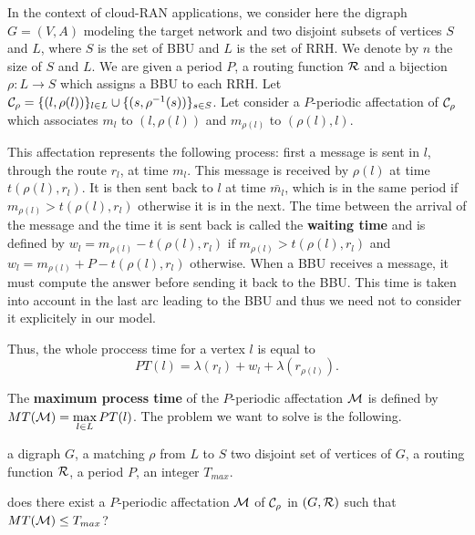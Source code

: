 \documentclass[a4paper,10pt]{article}
\begin{document}
      
      In the context of cloud-RAN applications, we consider here the digraph $G=(V,A)$ modeling the target network 
      and two disjoint subsets of vertices $S$ and $L$, where $S$ is the set of BBU and $L$ is the set of RRH. 
      We denote by $n$ the size of $S$ and $L$. We are given a period $P$, a routing function ${\cal R}$ and a bijection $\rho:L\rightarrow S$ which assigns a BBU to each RRH. Let ${\cal C}_{\rho} = \{(l,\rho(l))\}_{l \in L} \cup \{(s,\rho^{-1}(s))\}_{s \in S}$. Let consider a $P$-periodic affectation of ${\cal C}_{\rho}$ which associates $m_l$ to 
      $(l,\rho(l))$ and $m_{\rho(l)}$ to $(\rho(l),l)$.  
      
      This affectation represents the following process: first a message is sent in $l$, through the route $r_l$, at time $m_l$.
      This message is received by $\rho(l)$ at time $t(\rho(l),r_l)$. It is then sent back to $l$ at time $\bar{m_l}$,
      which is in the same period if $m_{\rho(l)} > t(\rho(l),r_l)$ otherwise it is in the next. The time between the arrival of
      the message and the time it is sent back is called the \textbf{waiting time} and is defined by $w_l = m_{\rho(l)} - t(\rho(l),r_l)$ if $m_{\rho(l)} > t(\rho(l),r_l)$ and $w_l = m_{\rho(l)} + P - t(\rho(l),r_l)$ otherwise.
      When a BBU receives a message, it must compute the answer before sending it back to the BBU. This time is taken into account
      in the last arc leading to the BBU and thus we need not to consider it explicitely in our model.
    
      Thus, the whole proccess time for a vertex $l$ is equal to
      $$
      PT(l)=\lambda(r_l)+ w_l+\lambda(r_{\rho(l)}).
      $$
      
    The {\bf maximum process time} of the $P$-periodic affectation ${\cal M} $ is defined by $MT({\cal M})=\max\limits_{l \in L} PT(l)$. The problem we want to solve is the following. 


        a digraph $G$, a matching $\rho$ from $L$ to $S$ two disjoint set of vertices of $G$, a routing function $\cal R$, a period $P$, an integer $T_{max}$.

       does there exist a $P$-periodic affectation ${\cal M}$ of ${\cal C}_{\rho}$ in $(G,{\cal R})$ such that $MT({\cal M}) \leq T_{max}$?

\end{document}
